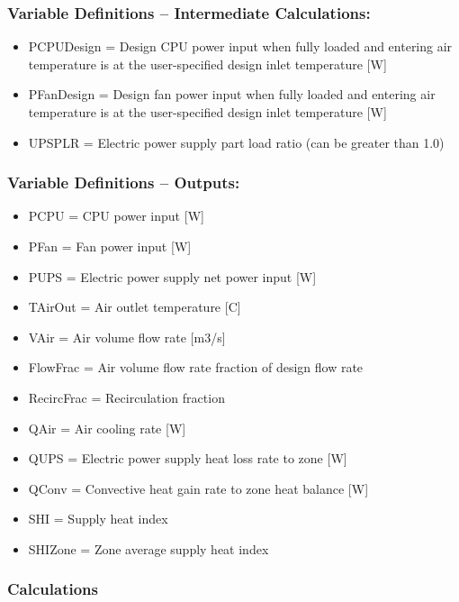 \subsubsection{Variable Definitions -- Intermediate Calculations:}\label{variable-definitions-intermediate-calculations}

\begin{itemize}
\tightlist
\item
  PCPUDesign = Design CPU power input when fully loaded and entering air temperature is at the user-specified design inlet temperature {[}W{]}
\item
  PFanDesign = Design fan power input when fully loaded and entering air temperature is at the user-specified design inlet temperature {[}W{]}
\item
  UPSPLR = Electric power supply part load ratio (can be greater than 1.0)
\end{itemize}

\subsubsection{Variable Definitions -- Outputs:}\label{variable-definitions-outputs}

\begin{itemize}
\tightlist
\item
  PCPU = CPU power input {[}W{]}
\item
  PFan = Fan power input {[}W{]}
\item
  PUPS = Electric power supply net power input {[}W{]}
\item
  TAirOut = Air outlet temperature {[}C{]}
\item
  VAir = Air volume flow rate {[}m3/s{]}
\item
  FlowFrac = Air volume flow rate fraction of design flow rate
\item
  RecircFrac = Recirculation fraction
\item
  QAir = Air cooling rate {[}W{]}
\item
  QUPS = Electric power supply heat loss rate to zone {[}W{]}
\item
  QConv = Convective heat gain rate to zone heat balance {[}W{]}
\item
  SHI = Supply heat index
\item
  SHIZone = Zone average supply heat index
\end{itemize}

\subsubsection{Calculations}\label{calculations}

